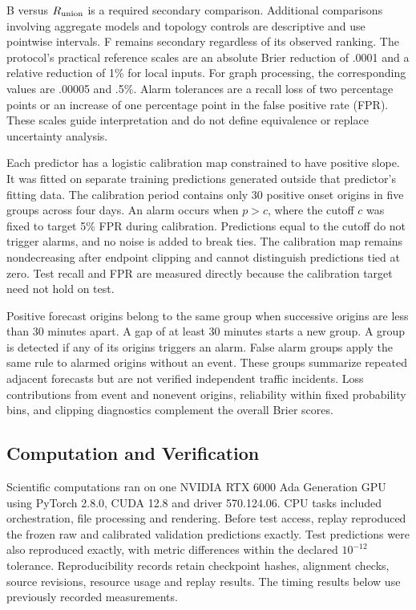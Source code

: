 \documentclass{llncs}
\begin{document}
B versus $R_{\rm union}$ is a required secondary comparison. Additional comparisons involving aggregate models and topology controls are descriptive and use pointwise intervals. F remains secondary regardless of its observed ranking. The protocol's practical reference scales are an absolute Brier reduction of .0001 and a relative reduction of 1\% for local inputs. For graph processing, the corresponding values are .00005 and .5\%. Alarm tolerances are a recall loss of two percentage points or an increase of one percentage point in the false positive rate (FPR). These scales guide interpretation and do not define equivalence or replace uncertainty analysis.

Each predictor has a logistic calibration map constrained to have positive slope. It was fitted on separate training predictions generated outside that predictor's fitting data. The calibration period contains only 30 positive onset origins in five groups across four days. An alarm occurs when $p>c$, where the cutoff $c$ was fixed to target 5\% FPR during calibration. Predictions equal to the cutoff do not trigger alarms, and no noise is added to break ties. The calibration map remains nondecreasing after endpoint clipping and cannot distinguish predictions tied at zero. Test recall and FPR are measured directly because the calibration target need not hold on test.

Positive forecast origins belong to the same group when successive origins are less than 30 minutes apart. A gap of at least 30 minutes starts a new group. A group is detected if any of its origins triggers an alarm. False alarm groups apply the same rule to alarmed origins without an event. These groups summarize repeated adjacent forecasts but are not verified independent traffic incidents. Loss contributions from event and nonevent origins, reliability within fixed probability bins, and clipping diagnostics complement the overall Brier scores.

\subsection{Computation and Verification}
Scientific computations ran on one NVIDIA RTX 6000 Ada Generation GPU using PyTorch 2.8.0, CUDA 12.8 and driver 570.124.06. CPU tasks included orchestration, file processing and rendering. Before test access, replay reproduced the frozen raw and calibrated validation predictions exactly. Test predictions were also reproduced exactly, with metric differences within the declared $10^{-12}$ tolerance. Reproducibility records retain checkpoint hashes, alignment checks, source revisions, resource usage and replay results. The timing results below use previously recorded measurements.
\end{document}
